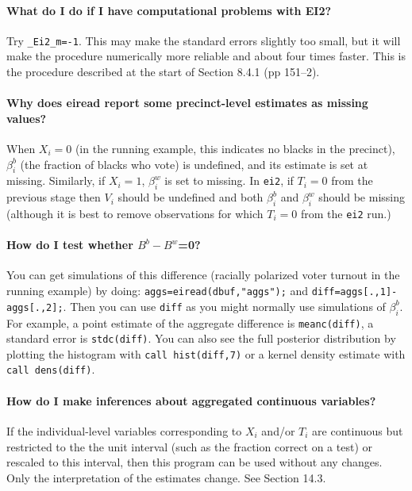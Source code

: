 \documentclass[11pt,titlepage]{article}
\begin{document}
\paragraph{What do I do if I have computational problems with EI2?}
Try \texttt{\_Ei2\_m=-1}.  This may make the standard errors slightly
too small, but it will make the procedure numerically more reliable
and about four times faster.  This is the procedure described at the
start of Section 8.4.1 (pp 151--2).

\paragraph{Why does eiread report some precinct-level estimates
  as missing values?}  When $X_i=0$ (in the running example, this
indicates no blacks in the precinct), $\beta_i^b$ (the fraction of
blacks who vote) is undefined, and its estimate is set at missing.
Similarly, if $X_i=1$, $\beta_i^w$ is set to missing.  In
\texttt{ei2}, if $T_i=0$ from the previous stage then $V_i$ should be
undefined and both $\beta_i^b$ and $\beta_i^w$ should be missing
(although it is best to remove observations for which $T_i=0$ from the
\texttt{ei2} run.)

\paragraph{How do I test whether $B^b-B^w$=0?} You can get simulations
of this difference (racially polarized voter turnout in the running
example) by doing: \texttt{aggs=eiread(dbuf,"aggs");} and
\texttt{diff=aggs[.,1]-aggs[.,2];}.  Then you can use \texttt{diff} as
you might normally use simulations of $\beta_i^b$.  For example, a
point estimate of the aggregate difference is \texttt{meanc(diff)}, a
standard error is \texttt{stdc(diff)}.  You can also see the full
posterior distribution by plotting the histogram with \texttt{call
  hist(diff,7)} or a kernel density estimate with \texttt{call
  dens(diff)}.

\paragraph{How do I make inferences about aggregated continuous variables?}
If the individual-level variables corresponding to $X_i$ and/or $T_i$
are continuous but restricted to the the unit interval (such as the
fraction correct on a test) or rescaled to this interval, then this
program can be used without any changes.  Only the interpretation of
the estimates change.  See Section 14.3.
\end{document}
